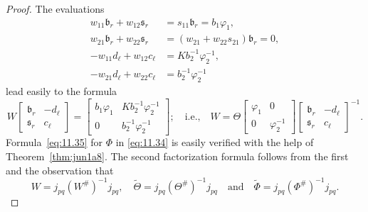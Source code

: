 \documentclass[12pt,twoside,a4paper]{amsart}
\theoremstyle{definition}
\numberwithin{equation}{section}
\begin{document}
\begin{proof}
The evaluations
\[
\begin{split}
w_{11}{{\mathfrak b}}_r+w_{12}{{\mathfrak s}}_r&=s_{11}{{\mathfrak b}}_r=b_1\varphi_1,\\
w_{21}{{\mathfrak b}}_r+w_{22}{{\mathfrak s}}_r&=(w_{21}+w_{22}s_{21}){{\mathfrak b}}_r=0,\\
-w_{11}d_\ell+w_{12}c_\ell&=
Kb_2^{-1}\varphi_2^{-1},\\
-w_{21}d_\ell+w_{22}c_\ell &=b_2^{-1}\varphi_2^{-1}
\end{split}
\]
lead easily to the formula
$$
W\begin{bmatrix}{{\mathfrak b}}_r&-d_\ell\\ {{\mathfrak s}}_r&c_\ell\end{bmatrix}=\begin{bmatrix}
b_1\varphi_1&Kb_2^{-1}\varphi_2^{-1}\\0&b_2^{-1}\varphi_2^{-1}\end{bmatrix};\quad\text{i.e.,}\quad
W=\Theta\begin{bmatrix}\varphi_1&0\\0&\varphi_2^{-1}\end{bmatrix}
\begin{bmatrix}{{\mathfrak b}}_r&-d_\ell\\ {{\mathfrak s}}_r&c_\ell\end{bmatrix}^{-1}.
$$
Formula~\eqref{eq:11.35} for $\Phi$ in \eqref{eq:11.34} is easily verified
with the help of Theorem~\ref{thm:jun1a8}. The second factorization
formula follows from the first and the observation that
$$
W=j_{pq}(W^\#)^{-1}j_{pq},\quad {{{\widetilde {\Theta}} }}=j_{pq}(\Theta^\#)^{-1}j_{pq}\quad
\text{and}\quad {{{\widetilde {\Phi}} }}=j_{pq}(\Phi^\#)^{-1}j_{pq}.
$$


\end{proof}
\end{document}
